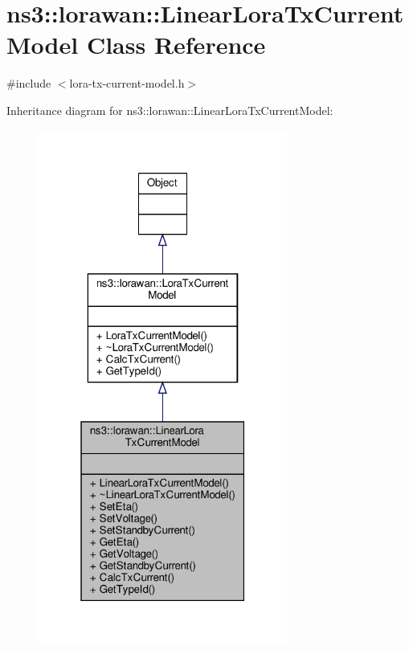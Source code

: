 \hypertarget{classns3_1_1lorawan_1_1LinearLoraTxCurrentModel}{}\section{ns3\+:\+:lorawan\+:\+:Linear\+Lora\+Tx\+Current\+Model Class Reference}
\label{classns3_1_1lorawan_1_1LinearLoraTxCurrentModel}


{\ttfamily \#include $<$lora-\/tx-\/current-\/model.\+h$>$}



Inheritance diagram for ns3\+:\+:lorawan\+:\+:Linear\+Lora\+Tx\+Current\+Model\+:
\nopagebreak
\begin{figure}[H]
\begin{center}
\leavevmode
\includegraphics[width=232pt]{classns3_1_1lorawan_1_1LinearLoraTxCurrentModel__inherit__graph}
\end{center}
\end{figure}


